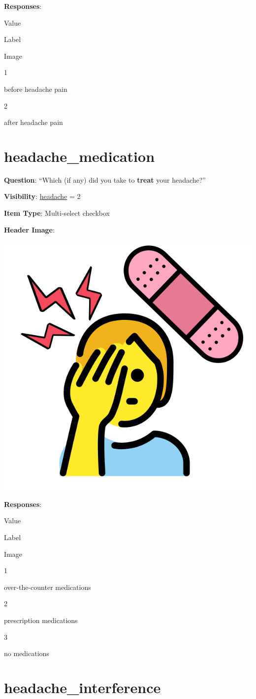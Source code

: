 \documentclass[]{book}
\begin{document}
\textbf{Responses}:

Value

Label

Image

1

before headache pain

2

after headache pain

\hypertarget{headache_medication}{%
\section{headache\_medication}\label{headache_medication}}

\textbf{Question}: ``Which (if any) did you take to \textbf{treat} your headache?''

\textbf{Visibility}: \protect\hyperlink{headache}{headache} = 2

\textbf{Item Type}: Multi-select checkbox

\textbf{Header Image}:

\begin{flushleft}\includegraphics[width=0.33\linewidth]{downloadFigs4latex_NIMH_Applet_Codebook/headache_medication_headerImg} \end{flushleft}

\textbf{Responses}:

Value

Label

Image

1

over-the-counter medications

2

prescription medications

3

no medications

\hypertarget{headache_interference}{%
\section{headache\_interference}\label{headache_interference}}
\end{document}
